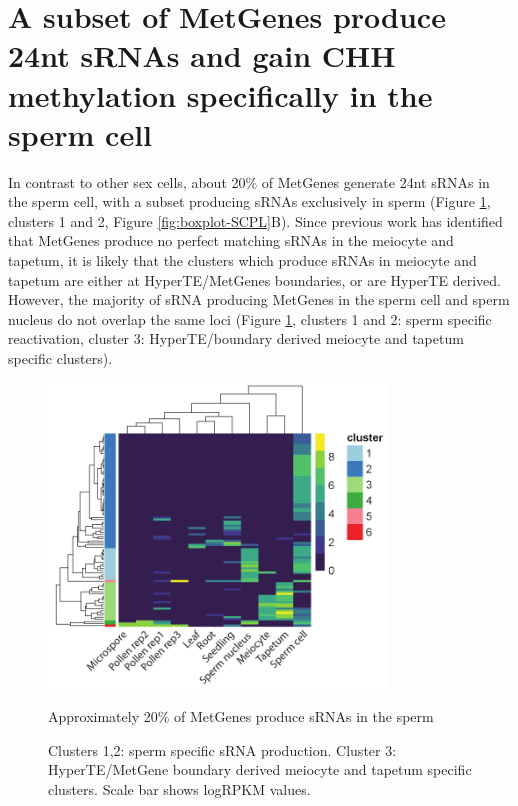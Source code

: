 \section{A subset of MetGenes produce 24nt sRNAs and gain CHH methylation specifically in the sperm cell}

In contrast to other sex cells, about 20\% of MetGenes generate 24nt sRNAs in the sperm cell, with a subset producing sRNAs exclusively in sperm (Figure \ref{fig:hm_metgene_reactivated}, clusters 1 and 2, Figure \ref{fig:boxplot-SCPL}B). Since previous work has identified that MetGenes produce no perfect matching sRNAs in the meiocyte and tapetum\cite{RN187}, it is likely that the clusters which produce sRNAs in meiocyte and tapetum are either at HyperTE/MetGenes boundaries, or are HyperTE derived. However, the majority of sRNA producing MetGenes in the sperm cell and sperm nucleus do not overlap the same loci (Figure \ref{fig:hm_metgene_reactivated}, clusters 1 and 2: sperm specific reactivation, cluster 3: HyperTE/boundary derived meiocyte and tapetum specific clusters).

\begin{figure}[htbp!] 
\centering
    \includegraphics[width=0.8\textwidth]{Chapter2/Figs/Figure11_Reactivated_MetGenes_heatmap.pdf}
\caption{Approximately 20\% of MetGenes produce sRNAs in the sperm}
\label{fig:hm_metgene_reactivated}
\captionsetup{font=small}
    \caption*{Clusters 1,2: sperm specific sRNA production. Cluster 3: HyperTE/MetGene boundary derived meiocyte and tapetum specific clusters. Scale bar shows logRPKM values.}
\end{figure}

